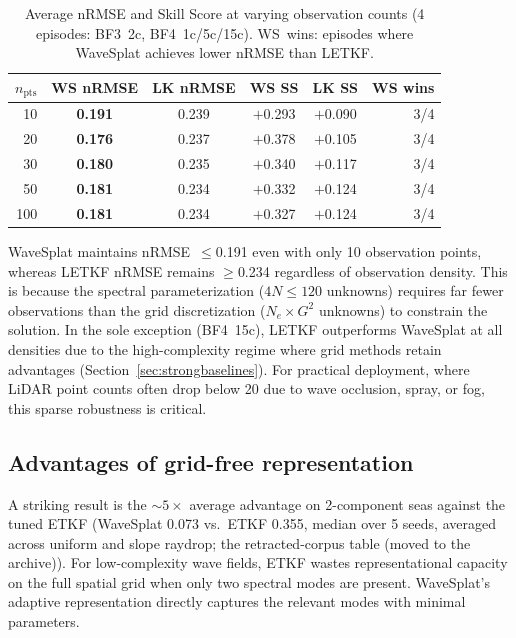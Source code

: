 \begin{table}[t]
\centering
\caption{Average nRMSE and Skill Score at varying observation counts
(4 episodes: BF3~2c, BF4~1c/5c/15c). WS~wins: episodes where
WaveSplat achieves lower nRMSE than LETKF.}
\label{tab:sparse_comparison}
\begin{tabular}{rccccr}
\toprule
$n_{\text{pts}}$ & WS nRMSE & LK nRMSE & WS SS & LK SS & WS wins \\
\midrule
10  & \textbf{0.191} & 0.239 & $+$0.293 & $+$0.090 & 3/4 \\
20  & \textbf{0.176} & 0.237 & $+$0.378 & $+$0.105 & 3/4 \\
30  & \textbf{0.180} & 0.235 & $+$0.340 & $+$0.117 & 3/4 \\
50  & \textbf{0.181} & 0.234 & $+$0.332 & $+$0.124 & 3/4 \\
100 & \textbf{0.181} & 0.234 & $+$0.327 & $+$0.124 & 3/4 \\
\bottomrule
\end{tabular}
\end{table}

WaveSplat maintains nRMSE~$\leq$0.191 even with only 10 observation
points, whereas LETKF nRMSE remains $\geq$0.234 regardless of
observation density.  This is because the spectral parameterization
($4N \leq 120$ unknowns) requires far fewer observations than the
grid discretization ($N_e \times G^2$ unknowns) to constrain the
solution.  In the sole exception (BF4~15c), LETKF outperforms
WaveSplat at all densities due to the high-complexity regime where
grid methods retain advantages (Section~\ref{sec:strongbaselines}).
For practical deployment, where LiDAR point counts often drop below
20 due to wave occlusion, spray, or fog, this sparse robustness is
critical.



\subsection{Advantages of grid-free representation}

A striking result is the ${\sim}5\times$ average advantage on 2-component
seas against the tuned ETKF (WaveSplat 0.073 vs.\ ETKF 0.355, median over
5 seeds, averaged across uniform and slope raydrop; the retracted-corpus table (moved to the archive)).
For low-complexity wave fields, ETKF
wastes representational capacity on the full spatial grid when only two
spectral modes are present. WaveSplat's adaptive representation directly
captures the relevant modes with minimal parameters.

